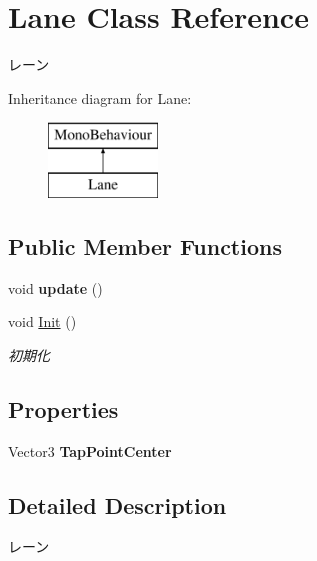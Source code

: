 \hypertarget{class_lane}{}\section{Lane Class Reference}
\label{class_lane}


レーン  


Inheritance diagram for Lane\+:\begin{figure}[H]
\begin{center}
\leavevmode
\includegraphics[height=2.000000cm]{class_lane}
\end{center}
\end{figure}
\subsection*{Public Member Functions}
\begin{DoxyCompactItemize}
\item 
void {\bfseries update} ()\hypertarget{class_lane_ab114e90cdab138167d959014930c7e14}{}\label{class_lane_ab114e90cdab138167d959014930c7e14}

\item 
void \hyperlink{class_lane_af823b917f0b54ccc138815a8bd25e773}{Init} ()
\begin{DoxyCompactList}\small\item\em 初期化 \end{DoxyCompactList}\end{DoxyCompactItemize}
\subsection*{Properties}
\begin{DoxyCompactItemize}
\item 
Vector3 {\bfseries Tap\+Point\+Center}\hypertarget{class_lane_a290e3d76fff1549f54065187e42a0c0e}{}\label{class_lane_a290e3d76fff1549f54065187e42a0c0e}

\end{DoxyCompactItemize}


\subsection{Detailed Description}
レーン 



